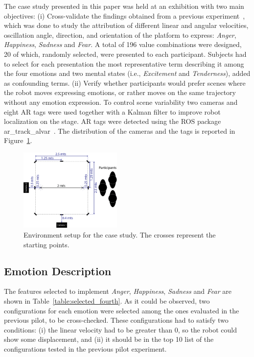  The case study presented in this paper was held at an exhibition with two main objectives:
 (i) Cross-validate the findings obtained from a previous experiment~\cite{Angel2017-2}, which was done to study the attribution of different linear and angular velocities, oscillation angle, direction, and orientation of the platform to express: \textit{Anger}, \textit{Happiness}, \textit{Sadness} and \textit{Fear}. A total of 196 value combinations were designed, 20 of which, randomly selected, were presented to each participant. Subjects had to select for each presentation the most representative term describing it among the four emotions and two mental states (i.e., \textit{Excitement} and \textit{Tenderness}), added as confounding terms. (ii) Verify whether participants would prefer scenes where the robot moves expressing emotions, or rather moves on the same trajectory without any emotion expression. To control scene variability two cameras and eight AR tags were used together with a Kalman filter to improve robot localization on the stage. AR tags were detected using the ROS package ar\_track\_alvar~\cite{artag2015}. The distribution of the cameras and the tags is reported in Figure~\ref{fig:setup_fourth}. 

\begin{figure}
	\centering
	\includegraphics[width=0.45\textwidth]{./Images/FourthCase.png} 
	\caption{Environment setup for the case study. The crosses represent the starting points.}
	\label{fig:setup_fourth}
\end{figure}

\subsection{Emotion Description}

The features selected to implement \textit{Anger}, \textit{Happiness}, \textit{Sadness} and \textit{Fear} are shown in Table~\ref{table:selected_fourth}. As it could be observed, two configurations for each emotion were selected among the ones evaluated in the previous pilot, to be cross-checked. These configurations had to satisfy two conditions: (i) the linear velocity had to be greater than $0$, so the robot could show some displacement, and (ii) it should be in the top 10 list of the configurations tested in the previous pilot experiment.


